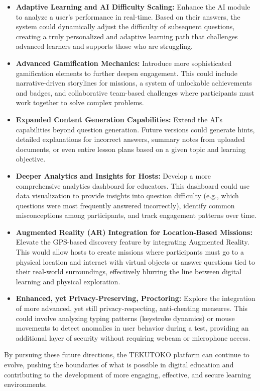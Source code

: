 \begin{itemize}
    \item \textbf{Adaptive Learning and AI Difficulty Scaling:} Enhance the AI module to analyze a user's performance in real-time. Based on their answers, the system could dynamically adjust the difficulty of subsequent questions, creating a truly personalized and adaptive learning path that challenges advanced learners and supports those who are struggling.

    \item \textbf{Advanced Gamification Mechanics:} Introduce more sophisticated gamification elements to further deepen engagement. This could include narrative-driven storylines for missions, a system of unlockable achievements and badges, and collaborative team-based challenges where participants must work together to solve complex problems.

    \item \textbf{Expanded Content Generation Capabilities:} Extend the AI's capabilities beyond question generation. Future versions could generate hints, detailed explanations for incorrect answers, summary notes from uploaded documents, or even entire lesson plans based on a given topic and learning objective.

    \item \textbf{Deeper Analytics and Insights for Hosts:} Develop a more comprehensive analytics dashboard for educators. This dashboard could use data visualization to provide insights into question difficulty (e.g., which questions were most frequently answered incorrectly), identify common misconceptions among participants, and track engagement patterns over time.

    \item \textbf{Augmented Reality (AR) Integration for Location-Based Missions:} Elevate the GPS-based discovery feature by integrating Augmented Reality. This would allow hosts to create missions where participants must go to a physical location and interact with virtual objects or answer questions tied to their real-world surroundings, effectively blurring the line between digital learning and physical exploration.

    \item \textbf{Enhanced, yet Privacy-Preserving, Proctoring:} Explore the integration of more advanced, yet still privacy-respecting, anti-cheating measures. This could involve analyzing typing patterns (keystroke dynamics) or mouse movements to detect anomalies in user behavior during a test, providing an additional layer of security without requiring webcam or microphone access.
\end{itemize}

By pursuing these future directions, the TEKUTOKO platform can continue to evolve, pushing the boundaries of what is possible in digital education and contributing to the development of more engaging, effective, and secure learning environments.